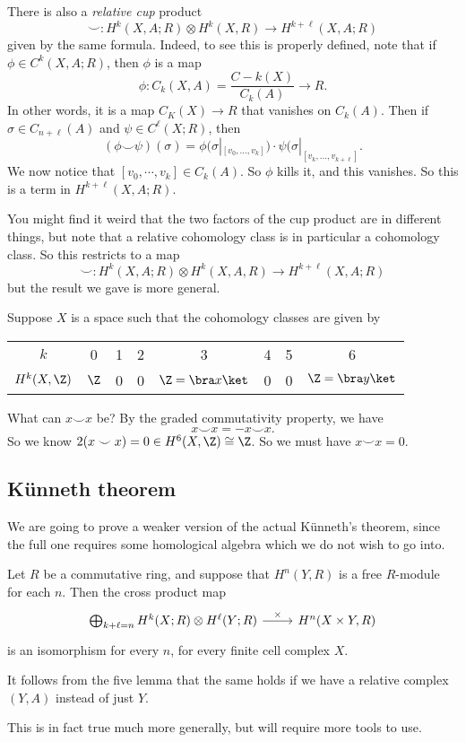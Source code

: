 \documentclass[a4paper]{article}
\begin{document}
There is also a \emph{relative cup} product
\[
  \smile: H^k(X, A; R) \otimes H^k(X, R) \to H^{k + \ell}(X, A; R)
\]
given by the same formula. Indeed, to see this is properly defined, note that if $\phi \in C^k(X, A; R)$, then $\phi$ is a map
\[
  \phi:C_k(X, A) = \frac{C-k(X)}{C_k(A)} \to R.
\]
In other words, it is a map $C_K(X) \to R$ that vanishes on $C_k(A)$. Then if $\sigma \in C_{n + \ell}(A)$ and $\psi \in C^\ell(X; R)$, then
\[
  (\phi \smile \psi)(\sigma) = \phi(\sigma|_{[v_0, \ldots, v_k]}) \cdot \psi(\sigma|_{[v_k, \ldots, v_{k + \ell}]}.
\]
We now notice that $[v_0, \cdots, v_k] \in C_k(A)$. So $\phi$ kills it, and this vanishes. So this is a term in $H^{k + \ell}(X, A; R)$.

You might find it weird that the two factors of the cup product are in different things, but note that a relative cohomology class is in particular a cohomology class. So this restricts to a map
\[
  \smile: H^k(X, A; R) \otimes H^k(X, A, R) \to H^{k + \ell}(X, A; R)
\]
but the result we gave is more general.

\begin{eg}
  Suppose $X$ is a space such that the cohomology classes are given by
  \begin{center}
    \begin{tabular}{cccccccc}
      $k$ & 0 & 1 & 2 & 3 & 4 & 5 & 6\\
      $H^k(X, \Z)$ & $\Z$ & 0 & 0 & $\Z = \bra x\ket$ & 0 & 0 & $\Z = \bra y\ket$
    \end{tabular}
  \end{center}
  What can $x \smile x$ be? By the graded commutativity property, we have
  \[
    x\smile x = - x \smile x.
  \]
  So we know $2(x \smile x) = 0 \in H^6(X, \Z) \cong \Z$. So we must have $x \smile x = 0$.
\end{eg}

\subsection{\texorpdfstring{K\"unneth}{Kunneth} theorem}
We are going to prove a weaker version of the actual K\"unneth's theorem, since the full one requires some homological algebra which we do not wish to go into.

\begin{thm}
  Let $R$ be a commutative ring, and suppose that $H^n(Y, R)$ is a free $R$-module for each $n$. Then the cross product map
  \[
    \begin{tikzcd}
      \bigoplus_{k + \ell = n}H^k(X; R) \otimes H^\ell(Y; R) \ar[r, "\times"] & H^n(X \times Y, R)
    \end{tikzcd}
  \]
  is an isomorphism for every $n$, for every finite cell complex $X$.

  It follows from the five lemma that the same holds if we have a relative complex $(Y, A)$ instead of just $Y$.
\end{thm}
This is in fact true much more generally, but will require more tools to use.
\end{document}
